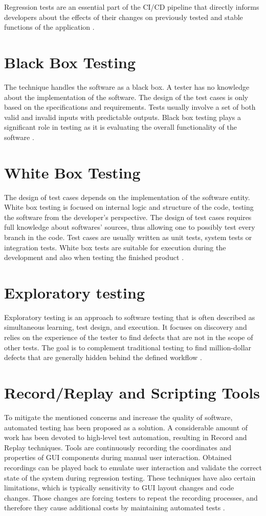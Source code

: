 Regression tests are an essential part of the CI/CD pipeline that directly informs developers about the effects of their changes on previously tested and stable functions of the application \cite{CI}.  

\section{Black Box Testing}
The technique handles the software as a black box. A tester has no knowledge about the implementation of the software. The design of the test cases is only based on the specifications and requirements. Tests usually involve a set of both valid and invalid inputs with predictable outputs. Black box testing plays a significant role in testing as it is evaluating the overall functionality of the software \cite{white_black}.

\section{White Box Testing}
The design of test cases depends on the implementation of the software entity. White box testing is focused on internal logic and structure of the code, testing the software from the developer's perspective. The design of test cases requires full knowledge about softwares' sources, thus allowing one to possibly test every branch in the code. Test cases are usually written as unit tests, system tests or integration tests. White box tests are suitable for execution during the development and also when testing the finished product \cite{white_black}.

\section{Exploratory testing}
Exploratory testing is an approach to software testing that is often described as simultaneous learning, test design, and execution. It focuses on discovery and relies on the experience of the tester to find defects that are not in the scope of other tests. The goal is to complement traditional testing to find million-dollar defects that are generally hidden behind the defined workflow \cite{exploratory_testing}.

\section{Record/Replay and Scripting Tools}\label{record_replay}
To mitigate the mentioned concerns and increase the quality of software, automated testing has been proposed as a solution. A considerable amount of work has been devoted to high-level test automation, resulting in Record and Replay techniques. Tools are continuously recording the coordinates and properties of GUI components during manual user interaction. Obtained recordings can be played back to emulate user interaction and validate the correct state of the system during regression testing. These techniques have also certain limitations, which is typically sensitivity to GUI layout changes and code changes. Those changes are forcing testers to repeat the recording processes, and therefore they cause additional costs by maintaining automated tests \cite{guitesting}. 

